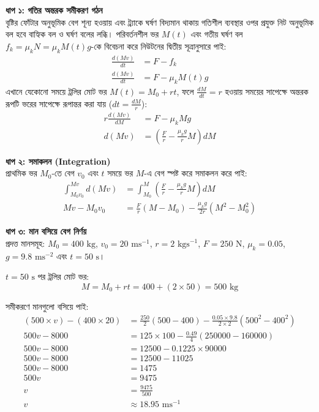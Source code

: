 \documentclass[12pt, a4paper]{article}
\begin{document}
\begin{tcolorbox}[solutionbox={সমাধান (Solution)}]
\noindent
\textbf{ধাপ ১: গতির অন্তরক সমীকরণ গঠন} \\
বৃষ্টির ফোঁটার অনুভূমিক বেগ শূন্য হওয়ায় এবং ট্র্যাকে ঘর্ষণ বিদ্যমান থাকায় গতিশীল ব্যবস্থার ওপর প্রযুক্ত নিট অনুভূমিক বল হবে বাহ্যিক বল ও ঘর্ষণ বলের লব্ধি। পরিবর্তনশীল ভর $M(t)$ এবং গতীয় ঘর্ষণ বল $f_k = \mu_k N = \mu_k M(t)g$-কে বিবেচনা করে নিউটনের দ্বিতীয় সূত্রানুসারে পাই:
\begin{align*}
\frac{d(Mv)}{dt} &= F - f_k \\
\frac{d(Mv)}{dt} &= F - \mu_k M(t) g
\end{align*}
এখানে যেকোনো সময়ে ট্রলির মোট ভর $M(t) = M_0 + rt$, ফলে $\frac{dM}{dt} = r$ হওয়ায় সময়ের সাপেক্ষে অন্তরক রূপটি ভরের সাপেক্ষে রূপান্তর করা যায় ($dt = \frac{dM}{r}$):
\begin{align*}
    r \frac{d(Mv)}{dM} &= F - \mu_k M g \\
    d(Mv) &= \left(\frac{F}{r} - \frac{\mu_k g}{r} M\right) dM
\end{align*}

\vspace{0.5em}
\noindent\textbf{ধাপ ২: সমাকলন (Integration)} \\
প্রাথমিক ভর $M_0$-তে বেগ $v_0$ এবং $t$ সময়ে ভর $M$-এ বেগ স্পষ্ট করে সমাকলন করে পাই:
\begin{align*}
    \int_{M_0 v_0}^{M v} d(Mv) &= \int_{M_0}^{M} \left(\frac{F}{r} - \frac{\mu_k g}{r} M\right) dM \\
    M v - M_0 v_0 &= \frac{F}{r}(M - M_0) - \frac{\mu_k g}{2r} (M^2 - M_0^2)
\end{align*}

\vspace{0.5em}
\noindent\textbf{ধাপ ৩: মান বসিয়ে বেগ নির্ণয়} \\
প্রদত্ত মানসমূহ: $M_0 = 400\text{ kg}$, $v_0 = 20\text{ ms}^{-1}$, $r = 2\text{ kgs}^{-1}$, $F = 250\text{ N}$, $\mu_k = 0.05$, $g = 9.8\text{ ms}^{-2}$ এবং $t = 50\text{ s}$।

$t = 50\text{ s}$ পর ট্রলির মোট ভর:
\[M = M_0 + rt = 400 + (2 \times 50) = 500\text{ kg}\]

সমীকরণে মানগুলো বসিয়ে পাই:
\begin{align*}
    (500 \times v) - (400 \times 20) &= \frac{250}{2}(500 - 400) - \frac{0.05 \times 9.8}{2 \times 2}(500^2 - 400^2) \\
    500 v - 8000 &= 125 \times 100 - \frac{0.49}{4}(250000 - 160000) \\
    500 v - 8000 &= 12500 - 0.1225 \times 90000 \\
    500 v - 8000 &= 12500 - 11025 \\
    500 v - 8000 &= 1475 \\
    500 v &= 9475 \\
    v &= \frac{9475}{500} \\
    v &\approx \mathbf{18.95}\text{ ms}^{-1}
\end{align*}
\end{tcolorbox}
\end{document}
